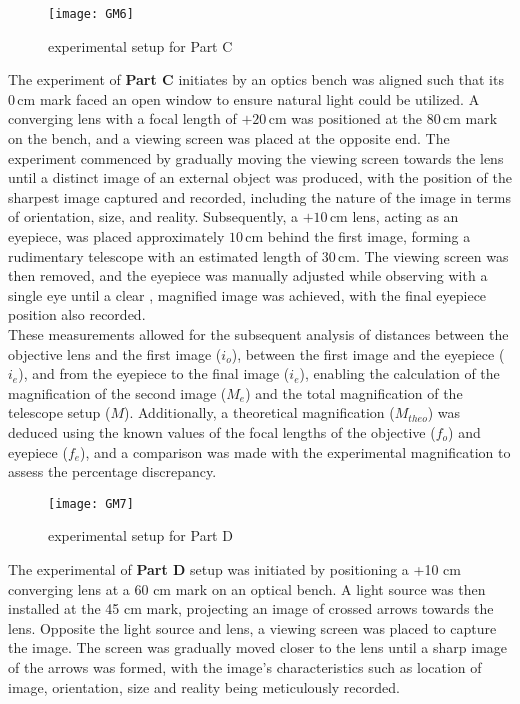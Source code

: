 \documentclass[a4paper,11pt]{article}
\begin{document}
\begin{figure}[htbp]
\centering
\texttt{[image: GM6]}
\caption{experimental setup for Part C}
\label{6}
\end{figure}
The experiment of \textbf{Part C} initiates by an optics bench was aligned such that its \(0 \, \text{cm}\) mark faced an open window to ensure natural light could be utilized. A converging lens with a focal length of \(+20 \, \text{cm}\) was positioned at the \(80 \, \text{cm}\) mark on the bench, and a viewing screen was placed at the opposite end. The experiment commenced by gradually moving the viewing screen towards the lens until a distinct image of an external object was produced, with the position of the sharpest image captured and recorded, including the nature of the image in terms of orientation, size, and reality. Subsequently, a \(+10 \, \text{cm}\) lens, acting as an eyepiece, was placed approximately \(10 \, \text{cm}\) behind the first image, forming a rudimentary telescope with an estimated length of \(30 \, \text{cm}\). The viewing screen was then removed, and the eyepiece was manually adjusted while observing with a single eye until a clear , magnified image was achieved, with the final eyepiece position also recorded.\\

These measurements allowed for the subsequent analysis of distances between the objective lens and the first image ($i_o$), between the first image and the eyepiece ($i_e$), and from the eyepiece to the final image ($i_e$), enabling the calculation of the magnification of the second image ($M_e$) and the total magnification of the telescope setup ($M$). Additionally, a theoretical magnification ($M_{theo}$) was deduced using the known values of the focal lengths of the objective ($f_o$) and eyepiece ($f_e$), and a comparison was made with the experimental magnification to assess the percentage discrepancy.
\begin{figure}[htbp]
\centering
\texttt{[image: GM7]}
\caption{experimental setup for Part D}
\label{6}
\end{figure}

The experimental of \textbf{Part D} setup was initiated by positioning a +10 cm converging lens at a 60 cm mark on an optical bench. A light source was then installed at the 45 cm mark, projecting an image of crossed arrows towards the lens. Opposite the light source and lens, a viewing screen was placed to capture the image. The screen was gradually moved closer to the lens until a sharp image of the arrows was formed, with the image's characteristics such as location of image, orientation, size and reality being meticulously recorded.\\
\end{document}
